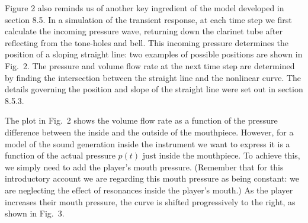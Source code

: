 
  Figure 2 also reminds us of another key ingredient of the model developed in 
  section 8.5. In a simulation of the transient response, at each time step we 
  first calculate the incoming pressure wave, returning down the clarinet tube 
  after reflecting from the tone-holes and bell. This incoming pressure 
  determines the position of a sloping straight line: two examples of possible 
  positions are shown in Fig.\ 2. The pressure and volume flow rate at the next 
  time step are determined by finding the intersection between the straight 
  line and the nonlinear curve. The details governing the position and slope of 
  the straight line were set out in section 8.5.3. 

  The plot in Fig.\ 2 shows the volume flow rate as a function of the pressure 
  difference between the inside and the outside of the mouthpiece. However, for 
  a model of the sound generation inside the instrument we want to express it 
  is a function of the actual pressure $p(t)$ just inside the mouthpiece. To 
  achieve this, we simply need to add the player’s mouth pressure. (Remember 
  that for this introductory account we are regarding this mouth pressure as 
  being constant: we are neglecting the effect of resonances inside the 
  player's mouth.) As the player increases their mouth pressure, the curve is 
  shifted progressively to the right, as shown in Fig.\ 3. 


